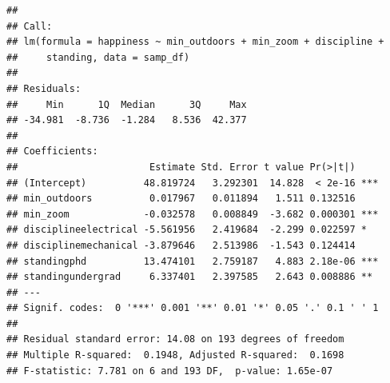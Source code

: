 \documentclass[
]{book}
\begin{document}
\begin{verbatim}
## 
## Call:
## lm(formula = happiness ~ min_outdoors + min_zoom + discipline + 
##     standing, data = samp_df)
## 
## Residuals:
##     Min      1Q  Median      3Q     Max 
## -34.981  -8.736  -1.284   8.536  42.377 
## 
## Coefficients:
##                       Estimate Std. Error t value Pr(>|t|)    
## (Intercept)          48.819724   3.292301  14.828  < 2e-16 ***
## min_outdoors          0.017967   0.011894   1.511 0.132516    
## min_zoom             -0.032578   0.008849  -3.682 0.000301 ***
## disciplineelectrical -5.561956   2.419684  -2.299 0.022597 *  
## disciplinemechanical -3.879646   2.513986  -1.543 0.124414    
## standingphd          13.474101   2.759187   4.883 2.18e-06 ***
## standingundergrad     6.337401   2.397585   2.643 0.008886 ** 
## ---
## Signif. codes:  0 '***' 0.001 '**' 0.01 '*' 0.05 '.' 0.1 ' ' 1
## 
## Residual standard error: 14.08 on 193 degrees of freedom
## Multiple R-squared:  0.1948, Adjusted R-squared:  0.1698 
## F-statistic: 7.781 on 6 and 193 DF,  p-value: 1.65e-07
\end{verbatim}

  
\end{document}
